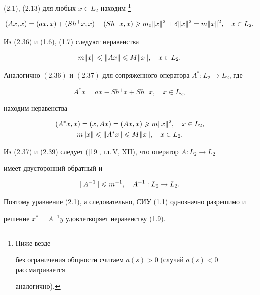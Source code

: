 (2.1), (2.13) для любых $x\in L_2$ находим \footnote{Ниже везде


без ограничения общности считаем $a(s)>0$ (случай $a(s)<0$ рассматривается


ана\-ло\-гич\-но).}


\begin{equation}


(Ax,x) = (ax,x)+(Sh^+x,x)+(Sh^-x,x)\gea m_0\|x\|^2+


\delta\|x\|^2 = m \|x\|^2,\quad x\in L_2.


\end{equation}


Из (2.36) и (1.6), (1.7) следуют неравенства


\begin{equation}


m\|x\|\lea \|Ax\|\lea M\|x\|,\quad x\in L_2.


\end{equation}


Аналогично $(2.36)$ и $(2.37)$ для сопряженного оператора $A^*:L_2\to


L_2$, где


$$


A^*x = ax - Sh^+x + Sh^-x,\quad x\in L_2,


$$


находим неравенства


\begin{gather}


(A^*x,x) = (x,Ax) = (Ax,x) \gea m\|x\|^2,\quad x\in L_2, \\


m\|x\|\lea \|A^*x\|\lea M\|x\|,\quad x\in L_2.


\end{gather}


Из (2.37) и (2.39) следует ([19], гл.\,V, XII), что оператор $A:L_2\to L_2$


имеет двусторонний обратный и


\begin{equation}


\|A^{-1}\|\lea m^{-1}, \quad A^{-1}:L_2\to L_2.


\end{equation}


Поэтому уравнение (2.1), а следовательно, СИУ (1.1) однозначно разрешимо и


решение $x^*=A^{-1}y$ удовлетворяет неравенству (1.9).





